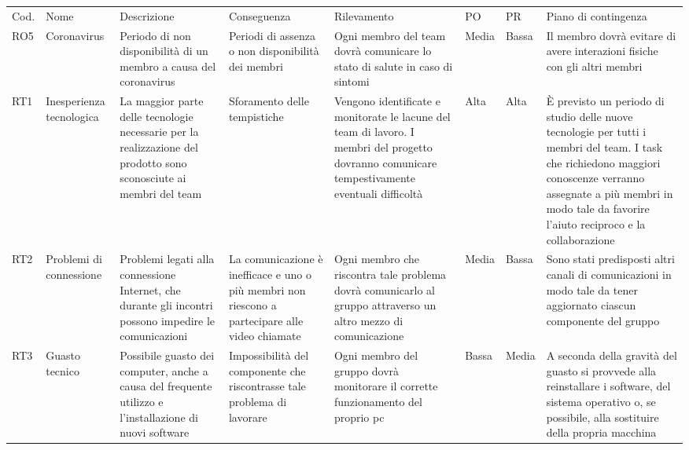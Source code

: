 \begin{landscape}
\begin{table}[h]
\begin{center}
\begin{tabular}{p{0.6cm}|p{2.2cm}|p{4cm}|p{2cm}|p{4cm}|p{0.9cm}|p{0.8cm}|p{4cm}}
Cod. & Nome & Descrizione & Conseguenza & Rilevamento & PO & PR & Piano di contingenza \\
RO5 & Coronavirus  & Periodo di non disponibilità di un membro a causa del coronavirus & Periodi di assenza o non disponibilità dei membri & Ogni membro del team dovrà comunicare lo stato di salute in caso di sintomi & Media & Bassa & Il membro dovrà evitare di avere interazioni fisiche con gli altri membri \\
RT1 & Inesperienza tecnologica & La maggior parte delle tecnologie necessarie per la realizzazione del prodotto sono sconosciute ai membri del team & Sforamento delle tempistiche & Vengono identificate e monitorate le lacune del team di lavoro. I membri del progetto dovranno comunicare tempestivamente eventuali difficoltà & Alta & Alta & È previsto un periodo di studio delle nuove tecnologie per tutti i membri del team. I task che richiedono maggiori conoscenze verranno assegnate a più membri in modo tale da favorire l’aiuto reciproco e la collaborazione \\
RT2 & Problemi di connessione & Problemi legati alla connessione Internet, che durante gli incontri possono impedire le comunicazioni & La comunicazione è inefficace e uno o più membri non riescono a partecipare alle video chiamate & Ogni membro che riscontra tale problema dovrà comunicarlo al gruppo attraverso un altro mezzo di comunicazione & Media & Bassa & Sono stati predisposti altri canali di comunicazioni in modo tale da tener aggiornato ciascun componente del gruppo \\
RT3 & Guasto tecnico & Possibile guasto dei computer, anche a causa del frequente utilizzo e l'installazione di nuovi software & Impossibilità del componente che riscontrasse tale problema di lavorare & Ogni membro del gruppo dovrà monitorare il corrette funzionamento del proprio pc & Bassa& Media& A seconda della gravità del guasto si provvede alla reinstallare i software, del sistema operativo o, se possibile, alla sostituire della propria macchina\\
\end{tabular}
\end{center}
\end{table}
\begin{table}[h]
\begin{center}
\begin{tabular}{p{0.6cm}|p{2.2cm}|p{4cm}|p{2cm}|p{4cm}|p{0.9cm}|p{0.8cm}|p{4cm}}

\end{tabular}
\end{center}
\end{table}
\end{landscape}
